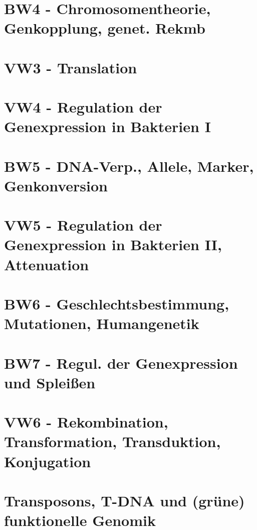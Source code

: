     \chapter{BW4 - Chromosomentheorie, Genkopplung, genet. Rekmb}
    

    \chapter{VW3 - Translation}
    

    \chapter{VW4 - Regulation der Genexpression in Bakterien I}
    

    \chapter{BW5 - DNA-Verp., Allele, Marker, Genkonversion}
    

    \chapter{VW5 - Regulation der Genexpression in Bakterien II, Attenuation}
    

    \chapter{BW6 - Geschlechtsbestimmung, Mutationen, Humangenetik}
    

    \chapter{BW7 - Regul. der Genexpression und Spleißen}
    

    \chapter{VW6 - Rekombination, Transformation, Transduktion, Konjugation}
    


    \chapter{Transposons, T-DNA und (grüne) funktionelle Genomik}
    


